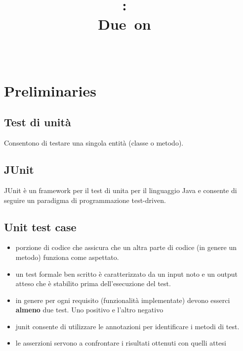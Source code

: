 \documentclass{article}
\title{
\vspace{2in}
\textmd{\textbf{\hmwkClass:\ \hmwkTitle}}\\
\normalsize\vspace{0.1in}\small{Due\ on\ \hmwkDueDate}\\
\vspace{0.1in}\large{\textit{\hmwkClassInstructor\ \hmwkClassTime}}
\vspace{3in}
}
\author{\textbf{\hmwkAuthorName}}
\date{} %
\begin{document}
\maketitle



\newpage
\tableofcontents
\newpage



\section{Preliminaries}
\subsection{Test di unit\`a}
Consentono di testare una singola entit\`a (classe o metodo). 
\subsection{JUnit}
JUnit \`e un framework per il test di unita per il linguaggio Java e consente di seguire un paradigma di programmazione test-driven.

\subsection{Unit test case}
\begin{itemize}
\item porzione di codice che assicura che un altra parte di codice (in genere un metodo) funziona come aspettato.
\item un test formale ben scritto \`e caratterizzato da un input noto e un output atteso che \`e stabilito prima dell'esecuzione del test.
\item in genere per ogni requisito (funzionalit\`a implementate) devono esserci \textbf{almeno} due test. Uno positivo e l'altro negativo
\item junit consente di utilizzare le annotazioni per identificare i metodi di test.
\item le asserzioni servono a confrontare i risultati ottenuti con quelli attesi
\end{itemize}
\end{document}
